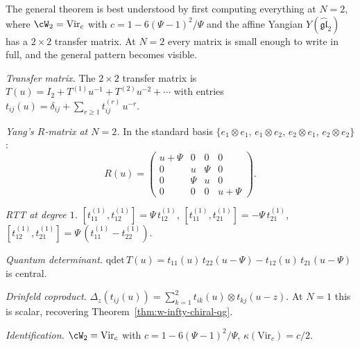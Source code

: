 The general theorem is best understood by first computing
everything at $N = 2$, where $\cW_2 = \mathrm{Vir}_c$ with
$c = 1 - 6(\Psi - 1)^2/\Psi$ and the affine Yangian
$Y(\widehat{\mathfrak{gl}}_2)$ has a $2 \times 2$ transfer
matrix. At $N = 2$ every matrix is small enough to write
in full, and the general pattern becomes visible.

\begin{example}[The $N = 2$ chiral quantum group:
$Y(\widehat{\mathfrak{gl}}_2)$ and Virasoro]
\label{ex:gl2-chiral-qg-staging}

\emph{Transfer matrix.}
The $2 \times 2$ transfer matrix is
$T(u) = I_2 + T^{(1)} u^{-1} + T^{(2)} u^{-2} + \cdots$
with entries $t_{ij}(u) = \delta_{ij}
+ \sum_{r \geq 1} t_{ij}^{(r)}\, u^{-r}$.

\medskip
\emph{Yang's $R$-matrix at $N = 2$.}
In the standard basis
$\{e_1 \otimes e_1,\, e_1 \otimes e_2,\,
e_2 \otimes e_1,\, e_2 \otimes e_2\}$:
\[
  R(u) =
  \begin{pmatrix}
    u + \Psi & 0 & 0 & 0 \\
    0 & u & \Psi & 0 \\
    0 & \Psi & u & 0 \\
    0 & 0 & 0 & u + \Psi
  \end{pmatrix}.
\]

\medskip
\emph{RTT at degree $1$.}
$[t_{11}^{(1)}, t_{12}^{(1)}] = \Psi\, t_{12}^{(1)}$,
$[t_{11}^{(1)}, t_{21}^{(1)}] = -\Psi\, t_{21}^{(1)}$,
$[t_{12}^{(1)}, t_{21}^{(1)}]
= \Psi\,(t_{11}^{(1)} - t_{22}^{(1)})$.

\medskip
\emph{Quantum determinant.}
$\mathrm{qdet}\, T(u)
= t_{11}(u)\, t_{22}(u - \Psi)
- t_{12}(u)\, t_{21}(u - \Psi)$ is central.

\medskip
\emph{Drinfeld coproduct.}
$\Delta_z(t_{ij}(u))
= \sum_{k=1}^{2} t_{ik}(u) \otimes t_{kj}(u-z)$.
At $N = 1$ this is scalar, recovering
Theorem~\ref{thm:w-infty-chiral-qg}.

\medskip
\emph{Identification.}
$\cW_2 = \mathrm{Vir}_c$ with
$c = 1 - 6(\Psi - 1)^2/\Psi$,
$\kappa(\mathrm{Vir}_c) = c/2$.
\end{example}

